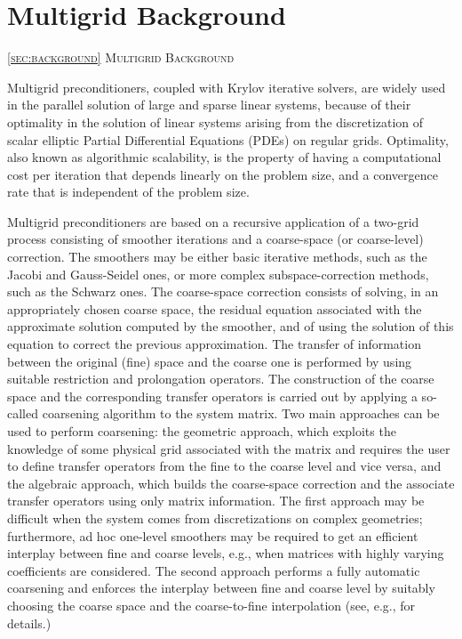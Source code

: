 \section{Multigrid Background\label{sec:background}} 
         {\textsc{\ref{sec:background} Multigrid Background}}

Multigrid preconditioners, coupled with Krylov iterative
solvers, are widely used in the parallel solution of large and sparse linear systems,
because of their optimality in the solution of linear systems arising from the
discretization of scalar elliptic Partial Differential Equations (PDEs) on regular grids.
Optimality, also known as algorithmic scalability, is the property 
of having a computational cost per iteration that depends linearly on
the problem size, and a convergence rate that is independent of the problem size.

Multigrid preconditioners are based on a recursive application of a two-grid process
consisting of smoother iterations and a coarse-space (or coarse-level) correction.
The smoothers may be either basic iterative methods, such as the Jacobi and Gauss-Seidel ones,
or more complex subspace-correction methods, such as the Schwarz ones.
The coarse-space correction consists of solving, in an appropriately chosen
coarse space, the residual equation associated with the approximate solution computed
by the smoother, and of using the solution of this equation to correct the
previous approximation. The transfer of information between the original
(fine) space and the coarse one is performed by using suitable restriction and
prolongation operators. The construction of the coarse space and the corresponding
transfer operators is carried out by applying a so-called coarsening algorithm to the system
matrix. Two main approaches can be used to perform coarsening: the geometric approach,
which exploits the knowledge of some physical grid associated with the matrix
and requires the user to define transfer operators from the fine
to the coarse level and vice versa, and the algebraic approach, which builds
the coarse-space correction and the associate transfer operators using only matrix
information. The first approach may be difficult when the system comes from
discretizations on complex geometries;
furthermore, ad hoc one-level smoothers may be required to get an efficient
interplay between fine and coarse levels, e.g., when matrices with highly varying coefficients
are considered. The second approach performs a fully automatic coarsening and enforces the
interplay between fine and coarse level by suitably choosing the coarse space and
the coarse-to-fine interpolation (see, e.g., \cite{Briggs2000,Stuben_01,dd2_96} for details.)

